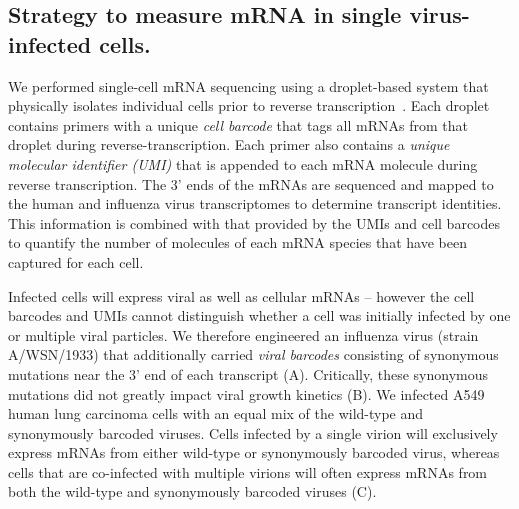 \documentclass[9pt,lineno]{elife}
\begin{document}
\subsection{Strategy to measure mRNA in single virus-infected cells.}
We performed single-cell mRNA sequencing using a droplet-based system that physically isolates individual cells prior to reverse transcription~\citep{zheng2017massively,macosko2015highly,Klein:2015ki}.
Each droplet contains primers with a unique \emph{cell barcode} that tags all mRNAs from that droplet during reverse-transcription.
Each primer also contains a \emph{unique molecular identifier (UMI)} that is appended to each mRNA molecule during reverse transcription.
The 3' ends of the mRNAs are sequenced and mapped to the human and influenza virus transcriptomes to determine transcript identities.
This information is combined with that provided by the UMIs and cell barcodes to quantify the number of molecules of each mRNA species that have been captured for each cell.

Infected cells will express viral as well as cellular mRNAs -- however the cell barcodes and UMIs cannot distinguish whether a cell was initially infected by one or multiple viral particles.
We therefore engineered an influenza virus (strain A/WSN/1933) that additionally carried \emph{viral barcodes} consisting of synonymous mutations near the 3' end of each transcript (A).
Critically, these synonymous mutations did not greatly impact viral growth kinetics (B).
We infected A549 human lung carcinoma cells with an equal mix of the wild-type and synonymously barcoded viruses.
Cells infected by a single virion will exclusively express mRNAs from either wild-type or synonymously barcoded virus, whereas cells that are co-infected with multiple virions will often express mRNAs from both the wild-type and synonymously barcoded viruses (C).
\end{document}
